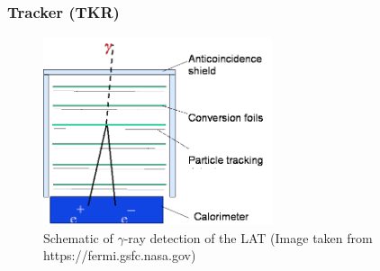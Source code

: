 




\subsubsection{Tracker (TKR)}

\begin{figure}[h!]
    \centering
    \includegraphics[width=0.6\textwidth]{content/background/figures/LAT_layers.png}
    \caption{
        Schematic of $\gamma$-ray detection of the LAT
        (Image taken from https://fermi.gsfc.nasa.gov)
    }
    \label{fig:fermi_lat_layers}
\end{figure}


